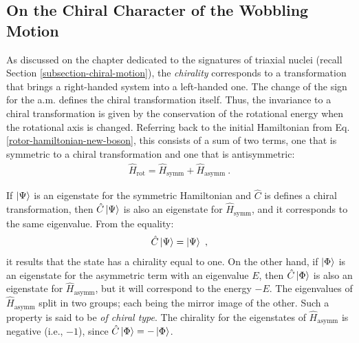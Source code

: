\subsection{On the Chiral Character of the Wobbling Motion}

As discussed on the chapter dedicated to the signatures of triaxial nuclei (recall Section \ref{subsection-chiral-motion}), the \emph{chirality} corresponds to a transformation that brings a right-handed system into a left-handed one. The change of the sign for the a.m. defines the chiral transformation itself. Thus, the invariance to a chiral transformation is given by the conservation of the rotational energy when the rotational axis is changed. Referring back to the initial Hamiltonian from Eq. \ref{rotor-hamiltonian-new-boson}, this consists of a sum of two terms, one that is symmetric to a chiral transformation and one that is antisymmetric:
\begin{align}
    \hat{H}_\text{rot}=\hat{H}_\text{symm}+\hat{H}_\text{asymm}\ .
\end{align}

If $\ket{\Psi}$ is an eigenstate for the symmetric Hamiltonian and $\hat{C}$ is defines a chiral transformation, then $\hat{C}\ket{\Psi}$ is also an eigenstate for $\hat{H}_\text{symm}$, and it corresponds to the same eigenvalue. From the equality:
\begin{align}
    \hat{C}\ket{\Psi}=\ket{\Psi}\ ,
\end{align}
it results that the state has a chirality equal to one. On the other hand, if $\ket{\Phi}$ is an eigenstate for the asymmetric term with an eigenvalue $E$, then $\hat{C}\ket{\Phi}$ is also an eigenstate for $\hat{H}_\text{asymm}$, but it will correspond to the energy $-E$. The eigenvalues of $\hat{H}_\text{asymm}$ split in two groups; each being the mirror image of the other. Such a property is said to be \emph{of chiral type}. The chirality for the eigenstates of $\hat{H}_\text{asymm}$ is negative (i.e., $-1$), since $\hat{C}\ket{\Phi}=-\ket{\Phi}$.


